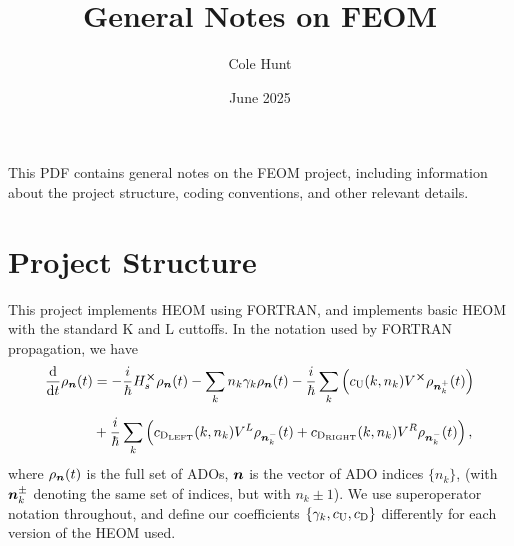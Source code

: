 \documentclass{article}
\title{General Notes on FEOM}
\author{Cole Hunt}
\date{June 2025}
\begin{document}
\maketitle
This PDF contains general notes on the FEOM project, including information about the project structure, coding conventions, and other relevant details.
\section{Project Structure}
This project implements HEOM using FORTRAN, and implements basic HEOM with the standard K and L cuttoffs. 
In the notation used by FORTRAN propagation, we have
\begin{align}
    \frac{{\rm d}}{{\rm d} t}\rho_{\boldsymbol{n}}(t) &= -\frac{i}{\hbar}H_s^{\cross}\rho_{\boldsymbol{n}}(t)  - \sum_k n_k\gamma_k \rho_{\boldsymbol{n}}(t)  - \frac{i}{\hbar}\sum_k \left(c_{\rm U}(k,n_k) V^{\cross}\rho_{\boldsymbol{n}_k^+}(t)\right)\nonumber \\[6pt]
    & + \frac{i}{\hbar}\sum_k \left(c_{\rm D_{LEFT}}(k,n_k) V^{L}\rho_{\boldsymbol{n}_k^-}(t) + c_{\rm D_{RIGHT}}(k,n_k) V^{R}\rho_{\boldsymbol{n}_k^-}(t)\right),
\end{align}
where $\rho_{\boldsymbol{n}}(t)$ is the full set of ADOs, $\boldsymbol{n}$ is the vector of ADO indices $\{n_k\}$, (with $\boldsymbol{n}_k^{\pm}$ denoting the same set of indices, but with $n_k\pm1$).
We use superoperator notation throughout, and define our coefficients $\{\gamma_k, c_{\rm U}, c_{\rm D}\}$ differently for each version of the HEOM used.
\end{document}

